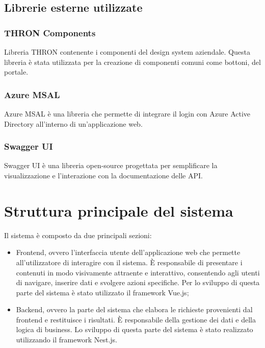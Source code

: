 \subsection{Librerie esterne utilizzate}\label{subsec:librerie-esterne}
\subsubsection{THRON Components}\label{subsubsec:thron-components}
Libreria THRON contenente i componenti del design system aziendale. Questa libreria è stata utilizzata per la creazione di componenti comuni come bottoni, del portale.
\subsubsection{Azure MSAL}\label{subsubsec:azure-MSAL}
Azure MSAL è una libreria che permette di integrare il login con Azure Active Directory all'interno di un'applicazione web.
\subsubsection{Swagger UI}\label{subsubsec:swagger-ui}
Swagger UI è una libreria open-source progettata per semplificare la visualizzazione e l'interazione con la documentazione delle API.

\section{Struttura principale del sistema}
Il sistema è composto da due principali sezioni:
\begin{itemize}
  \item Frontend, ovvero l'interfaccia utente dell'applicazione web che permette all'utilizzatore di interagire con il sistema. È responsabile di presentare i contenuti in modo visivamente attraente e interattivo, consentendo agli utenti di navigare, inserire dati e svolgere azioni specifiche. Per lo
  sviluppo di questa parte del sistema è stato utilizzato il framework Vue.js;
  \item Backend, ovvero la parte del sistema che elabora le richieste provenienti dal frontend e restituisce i risultati. È responsabile della gestione dei dati e della logica di business.
  Lo sviluppo di questa parte del sistema è stato realizzato utilizzando il framework Nest.js. 
\end{itemize}

